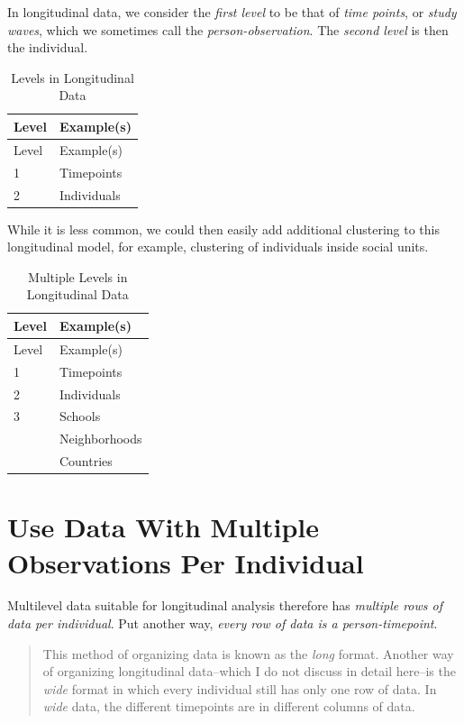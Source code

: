\documentclass[
  letterpaper,
  DIV=11,
  numbers=noendperiod]{scrreprt}
\begin{document}
In longitudinal data, we consider the \emph{first level} to be that of
\emph{time points}, or \emph{study waves}, which we sometimes call the
\emph{person-observation}. The \emph{second level} is then the
individual.

\hypertarget{tbl-levelslongitudinal}{}
\begin{longtable}[]{@{}ll@{}}
\caption{\label{tbl-levelslongitudinal}Levels in Longitudinal
Data}\tabularnewline
\toprule()
Level & Example(s) \\
\midrule()
\endfirsthead
\toprule()
Level & Example(s) \\
\midrule()
\endhead
1 & Timepoints \\
2 & Individuals \\
\bottomrule()
\end{longtable}

While it is less common, we could then easily add additional clustering
to this longitudinal model, for example, clustering of individuals
inside social units.

\hypertarget{tbl-levelslongitudinal2}{}
\begin{longtable}[]{@{}ll@{}}
\caption{\label{tbl-levelslongitudinal2}Multiple Levels in Longitudinal
Data}\tabularnewline
\toprule()
Level & Example(s) \\
\midrule()
\endfirsthead
\toprule()
Level & Example(s) \\
\midrule()
\endhead
1 & Timepoints \\
2 & Individuals \\
3 & Schools \\
& Neighborhoods \\
& Countries \\
\bottomrule()
\end{longtable}

\hypertarget{use-data-with-multiple-observations-per-individual}{%
\section{Use Data With Multiple Observations Per
Individual}\label{use-data-with-multiple-observations-per-individual}}

Multilevel data suitable for longitudinal analysis therefore has
\emph{multiple rows of data per individual}. Put another way,
\emph{every row of data is a person-timepoint}.

\begin{quote}
This method of organizing data is known as the \emph{long} format.
Another way of organizing longitudinal data--which I do not discuss in
detail here--is the \emph{wide} format in which every individual still
has only one row of data. In \emph{wide} data, the different timepoints
are in different columns of data.
\end{quote}
\end{document}
